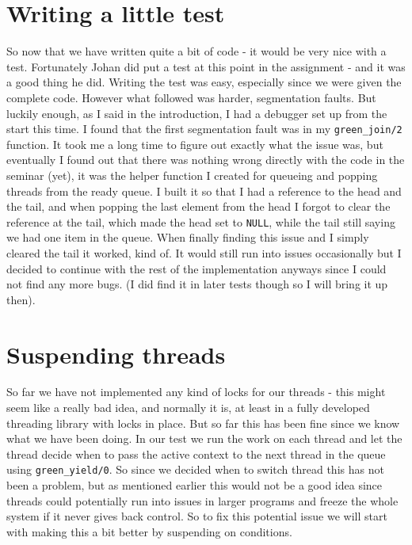 \documentclass[a4paper, 12pt]{article}
\def\code#1{\texttt{#1}}
\begin{document}
\section{Writing a little test}
So now that we have written quite a bit of code - it would be very nice with a test. Fortunately Johan did put a test at this point in the assignment - and it was a good thing he did. Writing the test was easy, especially since we were given the complete code. However what followed was harder, segmentation faults. But luckily enough, as I said in the introduction,  I had a debugger set up from the start this time. I found that the first segmentation fault was in my \code{green\_join/2} function. It took me a long time to figure out exactly what the issue was, but eventually I found out that there was nothing wrong directly with the code in the seminar (yet), it was the helper function I created for queueing and popping threads from the ready queue. I built it so that I had a reference to the head and the tail, and when popping the last element from the head I forgot to clear the reference at the tail, which made the head set to \code{NULL}, while the tail still saying we had one item in the queue. When finally finding this issue and I simply cleared the tail it worked, kind of. It would still run into issues occasionally but I decided to continue with the rest of the implementation anyways since I could not find any more bugs. (I did find it in later tests though so I will bring it up then).

\section{Suspending threads}
So far we have not implemented any kind of locks for our threads - this might seem like a really bad idea, and normally it is, at least in a fully developed threading library with locks in place. But so far this has been fine since we know what we have been doing. In our test we run the work on each thread and let the thread decide when to pass the active context to the next thread in the queue using \code{green\_yield/0}. So since we decided when to switch thread this has not been a problem, but as mentioned earlier this would not be a good idea since threads could potentially run into issues in larger programs and freeze the whole system if it never gives back control. So to fix this potential issue we will start with making this a bit better by suspending on conditions.


\end{document}
